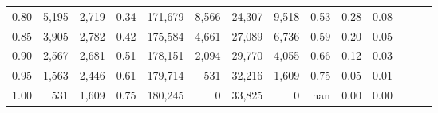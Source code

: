 \begin{tabular}{rrrrrrrrrrrrrr}
0.80 &   5,195 &  2,719 &  0.34 &  171,679 &    8,566 &  24,307 &   9,518 &  0.53 &  0.28 &      0.08 \\
0.85 &   3,905 &  2,782 &  0.42 &  175,584 &    4,661 &  27,089 &   6,736 &  0.59 &  0.20 &      0.05 \\
0.90 &   2,567 &  2,681 &  0.51 &  178,151 &    2,094 &  29,770 &   4,055 &  0.66 &  0.12 &      0.03 \\
0.95 &   1,563 &  2,446 &  0.61 &  179,714 &      531 &  32,216 &   1,609 &  0.75 &  0.05 &      0.01 \\
1.00 &     531 &  1,609 &  0.75 &  180,245 &        0 &  33,825 &       0 &   nan &  0.00 &      0.00 \\
\bottomrule
\end{tabular}
